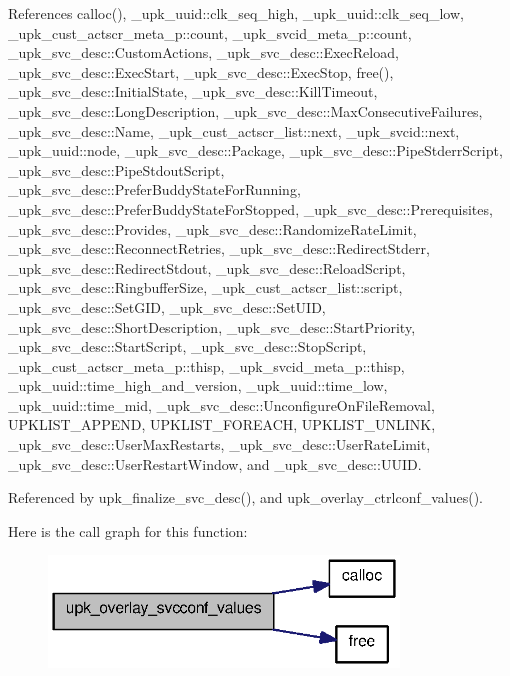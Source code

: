 References calloc(), \_\-upk\_\-uuid::clk\_\-seq\_\-high, \_\-upk\_\-uuid::clk\_\-seq\_\-low, \_\-upk\_\-cust\_\-actscr\_\-meta\_\-p::count, \_\-upk\_\-svcid\_\-meta\_\-p::count, \_\-upk\_\-svc\_\-desc::CustomActions, \_\-upk\_\-svc\_\-desc::ExecReload, \_\-upk\_\-svc\_\-desc::ExecStart, \_\-upk\_\-svc\_\-desc::ExecStop, free(), \_\-upk\_\-svc\_\-desc::InitialState, \_\-upk\_\-svc\_\-desc::KillTimeout, \_\-upk\_\-svc\_\-desc::LongDescription, \_\-upk\_\-svc\_\-desc::MaxConsecutiveFailures, \_\-upk\_\-svc\_\-desc::Name, \_\-upk\_\-cust\_\-actscr\_\-list::next, \_\-upk\_\-svcid::next, \_\-upk\_\-uuid::node, \_\-upk\_\-svc\_\-desc::Package, \_\-upk\_\-svc\_\-desc::PipeStderrScript, \_\-upk\_\-svc\_\-desc::PipeStdoutScript, \_\-upk\_\-svc\_\-desc::PreferBuddyStateForRunning, \_\-upk\_\-svc\_\-desc::PreferBuddyStateForStopped, \_\-upk\_\-svc\_\-desc::Prerequisites, \_\-upk\_\-svc\_\-desc::Provides, \_\-upk\_\-svc\_\-desc::RandomizeRateLimit, \_\-upk\_\-svc\_\-desc::ReconnectRetries, \_\-upk\_\-svc\_\-desc::RedirectStderr, \_\-upk\_\-svc\_\-desc::RedirectStdout, \_\-upk\_\-svc\_\-desc::ReloadScript, \_\-upk\_\-svc\_\-desc::RingbufferSize, \_\-upk\_\-cust\_\-actscr\_\-list::script, \_\-upk\_\-svc\_\-desc::SetGID, \_\-upk\_\-svc\_\-desc::SetUID, \_\-upk\_\-svc\_\-desc::ShortDescription, \_\-upk\_\-svc\_\-desc::StartPriority, \_\-upk\_\-svc\_\-desc::StartScript, \_\-upk\_\-svc\_\-desc::StopScript, \_\-upk\_\-cust\_\-actscr\_\-meta\_\-p::thisp, \_\-upk\_\-svcid\_\-meta\_\-p::thisp, \_\-upk\_\-uuid::time\_\-high\_\-and\_\-version, \_\-upk\_\-uuid::time\_\-low, \_\-upk\_\-uuid::time\_\-mid, \_\-upk\_\-svc\_\-desc::UnconfigureOnFileRemoval, UPKLIST\_\-APPEND, UPKLIST\_\-FOREACH, UPKLIST\_\-UNLINK, \_\-upk\_\-svc\_\-desc::UserMaxRestarts, \_\-upk\_\-svc\_\-desc::UserRateLimit, \_\-upk\_\-svc\_\-desc::UserRestartWindow, and \_\-upk\_\-svc\_\-desc::UUID.



Referenced by upk\_\-finalize\_\-svc\_\-desc(), and upk\_\-overlay\_\-ctrlconf\_\-values().



Here is the call graph for this function:
\nopagebreak
\begin{figure}[H]
\begin{center}
\leavevmode
\includegraphics[width=264pt]{group__config__impl_gaab28dbb04c28f723b90b0baba926408f_cgraph}
\end{center}
\end{figure}




